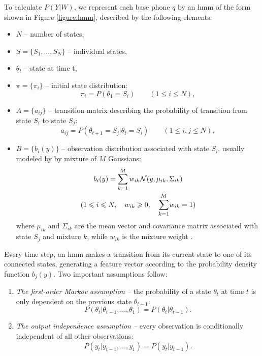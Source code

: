 To calculate $P(Y|W)$, we represent each base phone $q$ by an \gls{hmm} of the form shown in Figure \ref{figure:hmm}, described by the following elements:
\begin{itemize}
\item $N$ -- number of states,
\item $S=\{S_{1}, \ldots, S_{N}\}$ -- individual states,
\item $\theta_{t}$ -- state at time t,
\item $\pi=\{\pi_{i}\}$ -- initial state distribution:
  \begin{equation*}
    \pi_{i}=P(\theta_{1}=S_{i}) \qquad (1 \leqslant i \leqslant N),
  \end{equation*}
\item $A=\{a_{ij}\}$ -- transition matrix describing the probability of transition from state $S_{i}$ to state $S_{j}$:
  \begin{equation*}
    a_{ij}=P(\theta_{t+1}=S_{j}|\theta_{t}=S_{i}) \qquad (1 \leqslant i, j \leqslant N), 
  \end{equation*}
\item $B=\{b_{i}(y)\}$ -- observation distribution associated with state $S_{i}$, usually modeled by by mixture of $M$ Gaussians:
    \begin{gather}
      b_{i}(y)=\sum_{k=1}^{M}w_{ik}\mathcal{N}(y, \mu_{ik}, \Sigma_{ik}) \\
      (1 \leqslant i \leqslant N, \quad w_{ik} \geqslant 0, \quad\mathlarger{\sum_{k=1}^{M}}w_{ik}=1)\nonumber
    \end{gather}
where $\mu_{ik}$ and $\Sigma_{ik}$ are the mean vector and covariance matrix associated with state $S_{j}$ and mixture $k$, while $w_{ik}$ is the mixture weight \cite{juang1985mixture}.
\end{itemize}
Every time step, an \gls{hmm} makes a transition from its current state to one of its connected states, generating a feature vector according to the probability density function $b_{j}(y)$. Two important assumptions follow:
\begin{enumerate}
\item \textit{The first-order Markov assumption --} the probability of a state $\theta_{t}$ at time $t$ is only dependent on the previous state $\theta_{t-1}$:
  \begin{equation}
    P(\theta_{t}|\theta_{t-1}, \ldots, \theta_{1})=P(\theta_{t}|\theta_{t-1}).
  \end{equation}
\item \textit{The output independence assumption --} every observation is conditionally independent of all other observations: 
  \begin{equation}
    P(y_{t}|y_{t-1}, \ldots, y_{1})=P(y_{t}|y_{t-1}).
  \end{equation}
\end{enumerate}
